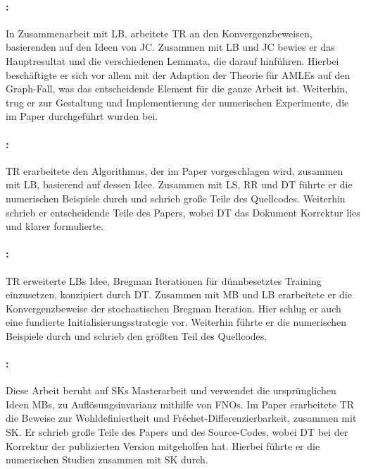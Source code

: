 \paragraph{\cite{bungert2021uniform}:} In Zusammenarbeit mit LB, arbeitete TR an den Konvergenzbeweisen, basierenden auf den Ideen von JC. Zusammen mit LB und JC bewies er das Hauptresultat und die verschiedenen Lemmata, die darauf hinführen. Hierbei beschäftigte er sich vor allem mit der Adaption der Theorie für AMLEs auf den Graph-Fall, was das entscheidende Element für die ganze Arbeit ist. Weiterhin, trug er zur Gestaltung und Implementierung der numerischen Experimente, die im Paper durchgeführt wurden bei. 

\paragraph{\cite{bungert2021clip}:} TR erarbeitete den Algorithmus, der im Paper vorgeschlagen wird, zusammen mit LB, basierend auf dessen Idee. Zusammen mit LS, RR und DT führte er die numerischen Beispiele durch und schrieb große Teile des Quellcodes. Weiterhin schrieb er entscheidende Teile des Papers, wobei DT das Dokument Korrektur lies und klarer formulierte.

\paragraph{\cite{bungert2022bregman}:} TR erweiterte LBs Idee, Bregman Iterationen für dünnbesetztes Training einzusetzen, konzipiert durch DT. Zusammen mit MB und LB erarbeitete er die Konvergenzbeweise der stochastischen Bregman Iteration. Hier schlug er auch eine fundierte Initialisierungsstrategie vor. Weiterhin führte er die numerischen Beispiele durch und schrieb den größten Teil des Quellcodes.

\paragraph{\cite{kabri2023resolution}:} Diese Arbeit beruht auf SKs Masterarbeit und verwendet die ursprünglichen Ideen MBs, zu Auflösungsinvarianz mithilfe von FNOs. Im Paper erarbeitete TR die Beweise zur Wohldefiniertheit und Fréchet-Differenzierbarkeit, zusammen mit SK. Er schrieb große Teile des Papers und des Source-Codes, wobei DT bei der Korrektur der publizierten Version mitgeholfen hat. Hierbei führte er die numerischen Studien zusammen mit SK durch.


